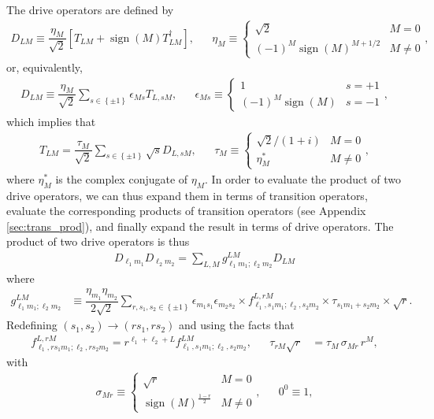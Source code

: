 \documentclass[nofootinbib,notitlepage,11pt]{revtex4-2}
\newcommand{\f}[2]{\dfrac{#1}{#2}} %
\newcommand{\p}[1]{\left(#1\right)} %
\renewcommand{\sp}[1]{\left[#1\right]} %
\renewcommand{\set}[1]{\left\{#1\right\}} %
\newcommand{\1}{\mathds{1}}
\DeclareMathOperator{\sign}{sign}
\begin{document}
The drive operators are defined by
\begin{align}
  D_{LM} \equiv \f{\eta_M}{\sqrt{2}}
  \sp{T_{LM} + \sign\p{M} T_{LM}^\dag},
  &&
  \eta_M \equiv
  \begin{cases}
    \sqrt{2} & M = 0 \\
    \p{-1}^M \sign\p{M}^{M+1/2} & M \ne 0
  \end{cases},
\end{align}
or, equivalently,
\begin{align}
  D_{LM} \equiv \f{\eta_M}{\sqrt{2}}
  \sum_{s\in\set{\pm1}} \epsilon_{Ms} T_{L,sM},
  &&
  \epsilon_{Ms} \equiv
  \begin{cases}
    1 & s = +1 \\
    \p{-1}^M \sign\p{M} & s = -1
  \end{cases},
\end{align}
which implies that
\begin{align}
  T_{LM} = \f{\tau_M}{\sqrt{2}}
  \sum_{s\in\set{\pm1}} \sqrt{s} D_{L,sM},
  &&
  \tau_M \equiv
  \begin{cases}
    \sqrt{2}/\p{1+i} & M = 0 \\
    \eta_M^* & M \ne 0
  \end{cases},
\end{align}
where $\eta_M^*$ is the complex conjugate of $\eta_M$.  In order to
evaluate the product of two drive operators, we can thus expand them
in terms of transition operators, evaluate the corresponding products
of transition operators (see Appendix \ref{sec:trans_prod}), and
finally expand the result in terms of drive operators.  The product of
two drive operators is thus
\begin{align}
  D_{\ell_1 m_1} D_{\ell_2 m_2}
  = \sum_{L,M} g_{\ell_1m_1;\ell_2m_2}^{LM} D_{LM}
  \label{eq:drive_prod}
\end{align}
where
\begin{align}
  g_{\ell_1m_1;\ell_2m_2}^{LM}
  &\equiv \f{\eta_{m_1}\eta_{m_2}}{2\sqrt2}
  \sum_{r,s_1,s_2\in\set{\pm1}} \epsilon_{m_1s_1} \epsilon_{m_2s_2}
  \times f_{\ell_1,s_1m_1;\ell_2,s_2m_2}^{L,rM}
  \times \tau_{s_1m_1+s_2m_2} \times \sqrt{r}.
\end{align}
Redefining $\p{s_1,s_2}\to\p{rs_1,rs_2}$ and using the facts that
\begin{align}
  f_{\ell_1,rs_1m_1;\ell_2,rs_2m_2}^{L,rM}
  = r^{\ell_1+\ell_2+L} f_{\ell_1,s_1m_1;\ell_2,s_2m_2}^{LM},
  &&
  \tau_{rM} \sqrt{r} &= \tau_M \, \sigma_{Mr} \, r^M,
\end{align}
with
\begin{align}
  \sigma_{Mr} \equiv
  \begin{cases}
    \sqrt{r} & M = 0 \\
    \sign\p{M}^{\frac{1-r}{2}} & M \ne 0
  \end{cases},
  &&
  0^0 \equiv 1,
\end{align}
\end{document}
